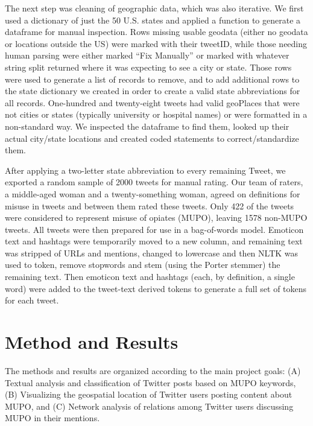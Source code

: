 \documentclass[sigconf]{acmart}
\begin{document}

The next step was cleaning of geographic data, which was also iterative. We 
first used a dictionary of just the 50 U.S. states and applied a function to 
generate a dataframe for manual inspection. Rows missing usable geodata (either 
no geodata or locations outside the US) were marked with their tweetID, while 
those needing human parsing were either marked ``Fix Manually'' or marked with 
whatever string split returned where it was expecting to see a city or state. 
Those rows were used to generate a list of records to remove, and to add 
additional rows to the state dictionary we created in order to create a valid 
state abbreviations for all records. One-hundred and twenty-eight tweets had 
valid geoPlaces that were not cities or states (typically university or hospital 
names) or were formatted in a non-standard way. We inspected the dataframe to 
find them, looked up their actual city/state locations and created coded 
statements to correct/standardize them.
 
After applying a two-letter state abbreviation to every remaining Tweet, we 
exported a random sample of 2000 tweets for manual rating. Our team of raters, 
a middle-aged woman and a twenty-something woman, agreed on definitions for 
misuse in tweets and between them rated these tweets. Only 422 of the tweets 
were considered to represent misuse of opiates (MUPO), leaving 1578 non-MUPO 
tweets. All tweets were then prepared for use in a bag-of-words model. Emoticon 
text and hashtags were temporarily moved to a new column, and remaining text 
was stripped of URLs and mentions, changed to lowercase and then NLTK was used 
to token, remove stopwords and stem (using the Porter stemmer) the remaining text. 
Then emoticon text and hashtags (each, by definition, a single word) were added 
to the tweet-text derived tokens to generate a full set of tokens for each tweet.
 

\section{Method and Results}
The methods and results are organized according to the main project goals: 
(A) Textual analysis and classification of Twitter posts based on MUPO keywords, 
(B) Visualizing the geospatial location of Twitter users posting content about
MUPO, and (C) Network analysis of relations among Twitter users discussing
MUPO in their mentions.  
\end{document}
